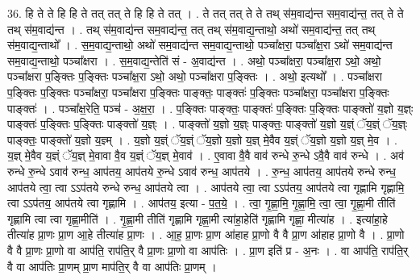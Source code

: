 \documentclass[17pt]{extarticle}
\begin{document}
36. हि ते ते हि हि ते तत् तत् ते हि हि ते तत् । . ते तत् तत् ते ते तथ् स॑म॒वाद्य॑न्त सम॒वाद्य॑न्त॒ तत् ते ते तथ् स॑म॒वाद्य॑न्त । . तथ् स॑म॒वाद्य॑न्त सम॒वाद्य॑न्त॒ तत् तथ् स॑म॒वाद्य॒न्ताथो॒ अथो॑ सम॒वाद्य॑न्त॒ तत् तथ् स॑म॒वाद्य॒न्ताथो᳚ । . स॒म॒वाद्य॒न्ताथो॒ अथो॑ सम॒वाद्य॑न्त सम॒वाद्य॒न्ताथो॒ पञ्चा᳚क्षरा॒ पञ्चा᳚क्ष॒रा ऽथो॑ सम॒वाद्य॑न्त सम॒वाद्य॒न्ताथो॒ पञ्चा᳚क्षरा । . स॒म॒वाद्य॒न्तेति॑ सं - अ॒वाद्य॑न्त । . अथो॒ पञ्चा᳚क्षरा॒ पञ्चा᳚क्ष॒रा ऽथो॒ अथो॒ पञ्चा᳚क्षरा प॒ङ्क्तिः प॒ङ्क्तिः पञ्चा᳚क्ष॒रा ऽथो॒ अथो॒ पञ्चा᳚क्षरा प॒ङ्क्तिः । . अथो॒ इत्यथो᳚ । . पञ्चा᳚क्षरा प॒ङ्क्तिः प॒ङ्क्तिः पञ्चा᳚क्षरा॒ पञ्चा᳚क्षरा प॒ङ्क्तिः पाङ्क्तः॒ पाङ्क्तः॑ प॒ङ्क्तिः पञ्चा᳚क्षरा॒ पञ्चा᳚क्षरा प॒ङ्क्तिः पाङ्क्तः॑ । . पञ्चा᳚क्ष॒रेति॒ पञ्च॑ - अ॒क्ष॒रा॒ । . प॒ङ्क्तिः पाङ्क्तः॒ पाङ्क्तः॑ प॒ङ्क्तिः प॒ङ्क्तिः पाङ्क्तो॑ य॒ज्ञो य॒ज्ञ्ः पाङ्क्तः॑ प॒ङ्क्तिः प॒ङ्क्तिः पाङ्क्तो॑ य॒ज्ञ्ः । . पाङ्क्तो॑ य॒ज्ञो य॒ज्ञ्ः पाङ्क्तः॒ पाङ्क्तो॑ य॒ज्ञो य॒ज्ञ्ं ॅय॒ज्ञ्ं ॅय॒ज्ञ्ः पाङ्क्तः॒ पाङ्क्तो॑ य॒ज्ञो य॒ज्ञ्म् । . य॒ज्ञो य॒ज्ञ्ं ॅय॒ज्ञ्ं ॅय॒ज्ञो य॒ज्ञो य॒ज्ञ् मे॒वैव य॒ज्ञ्ं ॅय॒ज्ञो य॒ज्ञो य॒ज्ञ् मे॒व । . य॒ज्ञ् मे॒वैव य॒ज्ञ्ं ॅय॒ज्ञ् मे॒वावा वै॒व य॒ज्ञ्ं ॅय॒ज्ञ् मे॒वाव॑ । . ए॒वावा वै॒वै वाव॑ रुन्धे रु॒न्धे ऽवै॒वै वाव॑ रुन्धे । . अव॑ रुन्धे रु॒न्धे ऽवाव॑ रुन्ध॒ आप॑तय॒ आप॑तये रु॒न्धे ऽवाव॑ रुन्ध॒ आप॑तये । . रु॒न्ध॒ आप॑तय॒ आप॑तये रुन्धे रुन्ध॒ आप॑तये त्वा॒ त्वा ऽऽप॑तये रुन्धे रुन्ध॒ आप॑तये त्वा । . आप॑तये त्वा॒ त्वा ऽऽप॑तय॒ आप॑तये त्वा गृह्णामि गृह्णामि॒ त्वा ऽऽप॑तय॒ आप॑तये त्वा गृह्णामि । . आप॑तय॒ इत्या - प॒त॒ये॒ । . त्वा॒ गृ॒ह्णा॒मि॒ गृ॒ह्णा॒मि॒ त्वा॒ त्वा॒ गृ॒ह्णा॒मी तीति॑ गृह्णामि त्वा त्वा गृह्णा॒मीति॑ । . गृ॒ह्णा॒मी तीति॑ गृह्णामि गृह्णा॒मी त्या॑हा॒हेति॑ गृह्णामि गृह्णा॒ मीत्या॑ह । . इत्या॑हा॒हे तीत्या॑ह प्रा॒णः प्रा॒ण आ॒हे तीत्या॑ह प्रा॒णः । . आ॒ह॒ प्रा॒णः प्रा॒ण आ॑हाह प्रा॒णो वै वै प्रा॒ण आ॑हाह प्रा॒णो वै । . प्रा॒णो वै वै प्रा॒णः प्रा॒णो वा आप॑ति॒ राप॑ति॒र् वै प्रा॒णः प्रा॒णो वा आप॑तिः । . प्रा॒ण इति॑ प्र - अ॒नः । . वा आप॑ति॒ राप॑ति॒र् वै वा आप॑तिः प्रा॒णम् प्रा॒ण माप॑ति॒र् वै वा आप॑तिः प्रा॒णम् । \newline
\pagebreak
{}
\end{document}
